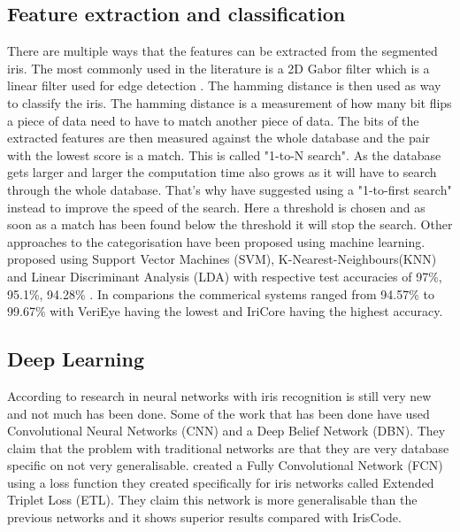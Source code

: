 \subsection{Feature extraction and classification}
There are multiple ways that the features can be extracted from the segmented iris. The most commonly used in the literature is a 2D Gabor filter which is a linear filter used for edge detection \citep{Daugman1993}. The hamming distance is then used as way to classify the iris. The hamming distance is a measurement of how many bit flips a piece of data need to have to match another piece of data. The bits of the extracted features are then measured against the whole database and the pair with the lowest score is a match. This is called "1-to-N search". As the database gets larger and larger the computation time also grows as it will have to search through the whole database. That's why \cite{Kuehlkamp2016} have suggested using a "1-to-first search" instead to improve the speed of the search. Here a threshold is chosen and as soon as a match has been found below the threshold it will stop the search. Other approaches to the categorisation have been proposed using machine learning. \cite{Khan2017a} proposed using Support Vector Machines (SVM), K-Nearest-Neighbours(KNN) and Linear Discriminant Analysis (LDA) with respective test accuracies of 97\%, 95.1\%, 94.28\% . In comparions the  commerical systems ranged from 94.57\% to  99.67\% with VeriEye having the lowest and IriCore having the highest accuracy. 

\subsection{Deep Learning}
According to \cite{Zhao2017} research in neural networks with iris recognition is still very new and not much has been done. Some of the work that has been done have used Convolutional Neural Networks (CNN) and a Deep Belief Network (DBN). They claim that the problem with traditional networks are that they are very database specific on not very generalisable. \cite{Zhao2017} created a Fully Convolutional Network (FCN) using a loss function they created specifically for iris networks called Extended Triplet Loss (ETL). They claim this network is more generalisable than the previous networks and it shows superior results compared with IrisCode.






